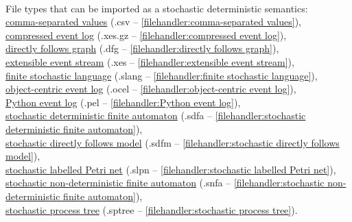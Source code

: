 {\\File types that can be imported as a stochastic deterministic semantics: \\\null\qquad\hyperref[filehandler:comma-separated values]{comma-separated values} (.csv -- \cref{filehandler:comma-separated values}), \\\null\qquad\hyperref[filehandler:compressed event log]{compressed event log} (.xes.gz -- \cref{filehandler:compressed event log}), \\\null\qquad\hyperref[filehandler:directly follows graph]{directly follows graph} (.dfg -- \cref{filehandler:directly follows graph}), \\\null\qquad\hyperref[filehandler:extensible event stream]{extensible event stream} (.xes -- \cref{filehandler:extensible event stream}), \\\null\qquad\hyperref[filehandler:finite stochastic language]{finite stochastic language} (.slang -- \cref{filehandler:finite stochastic language}), \\\null\qquad\hyperref[filehandler:object-centric event log]{object-centric event log} (.ocel -- \cref{filehandler:object-centric event log}), \\\null\qquad\hyperref[filehandler:Python event log]{Python event log} (.pel -- \cref{filehandler:Python event log}), \\\null\qquad\hyperref[filehandler:stochastic deterministic finite automaton]{stochastic deterministic finite automaton} (.sdfa -- \cref{filehandler:stochastic deterministic finite automaton}), \\\null\qquad\hyperref[filehandler:stochastic directly follows model]{stochastic directly follows model} (.sdfm -- \cref{filehandler:stochastic directly follows model}), \\\null\qquad\hyperref[filehandler:stochastic labelled Petri net]{stochastic labelled Petri net} (.slpn -- \cref{filehandler:stochastic labelled Petri net}), \\\null\qquad\hyperref[filehandler:stochastic non-deterministic finite automaton]{stochastic non-deterministic finite automaton} (.snfa -- \cref{filehandler:stochastic non-deterministic finite automaton}), \\\null\qquad\hyperref[filehandler:stochastic process tree]{stochastic process tree} (.sptree -- \cref{filehandler:stochastic process tree}).
}
